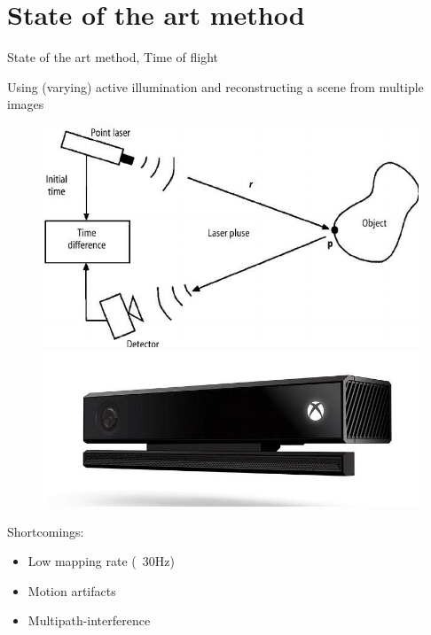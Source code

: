 %
%
\section{State of the art method}
\begin{frame}{State of the art method, Time of flight}

Using (varying) active illumination and reconstructing a scene from multiple images
\begin{figure}
\includegraphics[scale=0.15]{pictures/polop2}
\includegraphics[scale=0.2]{pictures/polop1}
\end{figure}
Shortcomings:
\begin{itemize}
\item Low mapping rate (~30Hz)
\item Motion artifacts
\item Multipath-interference
\end{itemize}
\end{frame}


